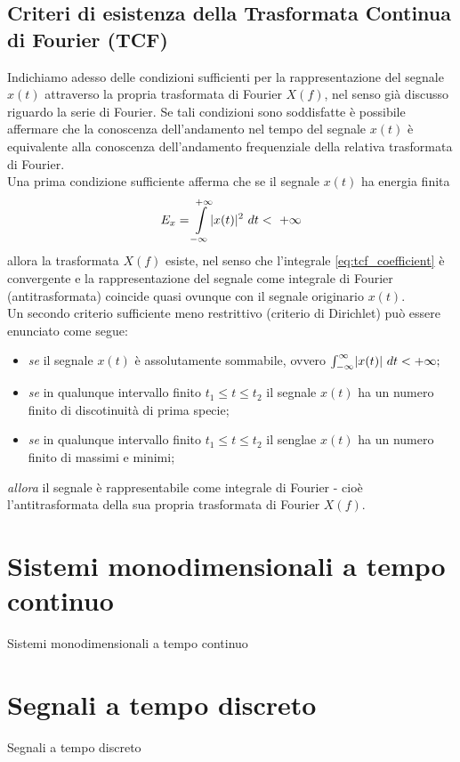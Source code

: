 \documentclass[12pt,oneside,openany]{memoir}
\numberwithin{equation}{subsection}
\DeclarePairedDelimiter{\abs}{\lvert}{\rvert}
\newcommand{\dt}{\ dt}
\begin{document}
\newpage
\subsection{Criteri di esistenza della Trasformata Continua di Fourier (TCF)}
Indichiamo adesso delle condizioni sufficienti per la rappresentazione del segnale $x(t)$ attraverso la propria trasformata di Fourier $X(f)$, nel senso gi\`a discusso riguardo la serie di Fourier. Se tali condizioni sono soddisfatte \`e possibile affermare che la conoscenza dell'andamento nel tempo del segnale $x(t)$ \`e equivalente alla conoscenza dell'andamento frequenziale della relativa trasformata di Fourier.\\
Una prima condizione sufficiente afferma che se il segnale $x(t)$ ha energia finita
\begin{equation}
	E_x = \int\displaylimits_{-\infty}^{+\infty} \abs{x(t)}^2 \dt < \ +\infty
\end{equation}
allora la trasformata $X(f)$ esiste, nel senso che l'integrale \eqref{eq:tcf_coefficient} \`e convergente e la rappresentazione del segnale come integrale di Fourier (antitrasformata) coincide quasi ovunque con il segnale originario $x(t)$.\\
Un secondo criterio sufficiente meno restrittivo (criterio di Dirichlet) pu\`o essere enunciato come segue:
\begin{itemize}
	\item \textit{se} il segnale $x(t)$ \`e assolutamente sommabile, ovvero $\int_{-\infty}^{\infty} \abs{x(t)} \dt < +\infty;$
	\item \textit{se} in qualunque intervallo finito $t_1 \leq t \leq t_2$ il segnale $x(t)$ ha un numero finito di discotinuit\`a di prima specie;
	\item \textit{se} in qualunque intervallo finito $t_1 \leq t \leq t_2$ il senglae $x(t)$ ha un numero finito di massimi e minimi;
\end{itemize}
\textit{allora} il segnale \`e rappresentabile come integrale di Fourier - cio\`e l'antitrasformata della sua propria trasformata di Fourier $X(f)$.

\newpage
\section{Sistemi monodimensionali a tempo continuo}
Sistemi monodimensionali a tempo continuo

\newpage
\section{Segnali a tempo discreto}
Segnali a tempo discreto
\end{document}
